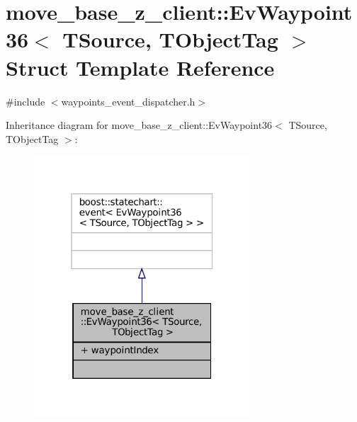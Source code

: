 \hypertarget{structmove__base__z__client_1_1EvWaypoint36}{}\section{move\+\_\+base\+\_\+z\+\_\+client\+:\+:Ev\+Waypoint36$<$ T\+Source, T\+Object\+Tag $>$ Struct Template Reference}
\label{structmove__base__z__client_1_1EvWaypoint36}


{\ttfamily \#include $<$waypoints\+\_\+event\+\_\+dispatcher.\+h$>$}



Inheritance diagram for move\+\_\+base\+\_\+z\+\_\+client\+:\+:Ev\+Waypoint36$<$ T\+Source, T\+Object\+Tag $>$\+:
\nopagebreak
\begin{figure}[H]
\begin{center}
\leavevmode
\includegraphics[width=229pt]{structmove__base__z__client_1_1EvWaypoint36__inherit__graph}
\end{center}
\end{figure}


